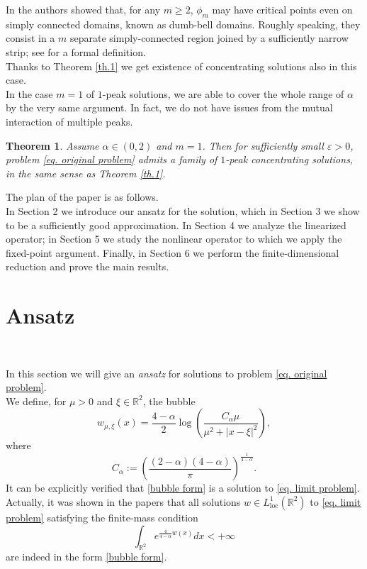 \documentclass[11pt]{article}
\newtheorem{theorem}{Theorem}[section]
\begin{document}
In \cite[Theorem 5.4]{esp} the authors showed that, for any $m\ge2$, $\phi_m$ may have critical points even on simply connected domains, known as dumb-bell domains. Roughly speaking, they consist in a $m$ separate simply-connected region joined by a sufficiently narrow strip; see \cite[Section 5]{esp} for a formal definition.\\
Thanks to Theorem \ref{th.1} we get existence of concentrating solutions also in this case.\\

In the case $m=1$ of $1$-peak solutions, we are able to cover the whole range of $\alpha$ by the very same argument. In fact, we do not have issues from the mutual interaction of multiple peaks.

\begin{theorem}\label{m=1}
Assume $\alpha\in(0,2)$ and $m=1$. Then for sufficiently small $\varepsilon>0$, problem \eqref{eq. original problem} admits a family of $1$-peak concentrating solutions, in the same sense as Theorem \ref{th.1}.
\end{theorem}

The plan of the paper is as follows.\\
In Section 2 we introduce our ansatz for the solution, which in Section 3 we show to be a sufficiently good approximation. In Section 4 we analyze the linearized operator; in Section 5 we study the nonlinear operator to which we apply the fixed-point argument. Finally, in Section 6 we perform the finite-dimensional reduction and prove the main results.

\section{Ansatz}\

In this section we will give an \emph{ansatz} for solutions to problem \eqref{eq. original problem}.\\

We define, for $\mu>0$ and $\xi\in\mathbb R^2$, the bubble
\begin{equation}\label{bubble form}
w_{\mu,\xi}(x)=\frac{4-\alpha}2\log\left(\frac{C_\alpha\mu}{\mu^2+|x-\xi|^2}\right),
\end{equation}
where 
$$C_\alpha:=\left(\frac{(2-\alpha)(4-\alpha)}\pi\right)^{\frac1{4-\alpha}}.$$
It can be explicitly verified that \eqref{bubble form} is a solution to \eqref{eq. limit problem}.\\
Actually, it was shown in the papers \cite{guopeng_2024,niu,gluck,yangyu} that all solutions $w\in L^1_\mathrm{loc}\left(\mathbb R^2\right)$ to \eqref{eq. limit problem} satisfying the finite-mass condition
$$\int_{\mathbb R^2}e^{\frac4{4-\alpha}w(x)}dx<+\infty$$
are indeed in the form \eqref{bubble form}.\\
\end{document}
